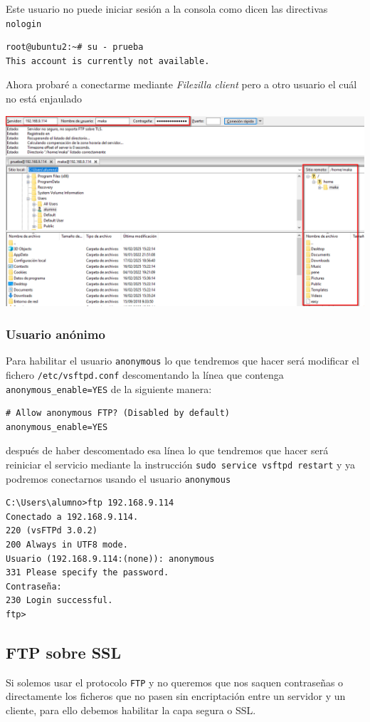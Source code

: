\documentclass[11pt]{article}
\begin{document}
Este usuario no puede iniciar sesión a la consola como dicen las directivas \texttt{nologin}
\begin{verbatim}
root@ubuntu2:~# su - prueba
This account is currently not available.
\end{verbatim}

Ahora probaré a conectarme mediante \emph{Filezilla client} pero a otro usuario el cuál no está enjaulado

\begin{center}
\includegraphics[width=.9\linewidth]{./media/ftp-3.png}
\end{center}

\subsubsection{Usuario anónimo}
\label{sec:org695b1ef}
Para habilitar el usuario \texttt{anonymous} lo que tendremos que hacer será modificar el fichero \texttt{/etc/vsftpd.conf} descomentando la línea que contenga \texttt{anonymous\_enable=YES} de la siguiente manera:
\begin{verbatim}
# Allow anonymous FTP? (Disabled by default)
anonymous_enable=YES
\end{verbatim}

después de haber descomentado esa línea lo que tendremos que hacer será reiniciar el servicio mediante la instrucción \texttt{sudo service vsftpd restart} y ya podremos conectarnos usando el usuario
\texttt{anonymous}
\begin{verbatim}
C:\Users\alumno>ftp 192.168.9.114
Conectado a 192.168.9.114.
220 (vsFTPd 3.0.2)
200 Always in UTF8 mode.
Usuario (192.168.9.114:(none)): anonymous
331 Please specify the password.
Contraseña:
230 Login successful.
ftp>
\end{verbatim}
\subsection{FTP sobre SSL}
\label{sec:org4c8b3cf}
Si solemos usar el protocolo \texttt{FTP} y no queremos que nos saquen contraseñas o directamente los ficheros que no pasen sin encriptación entre un servidor y un cliente, para ello debemos
habilitar la capa segura o SSL.
\end{document}
